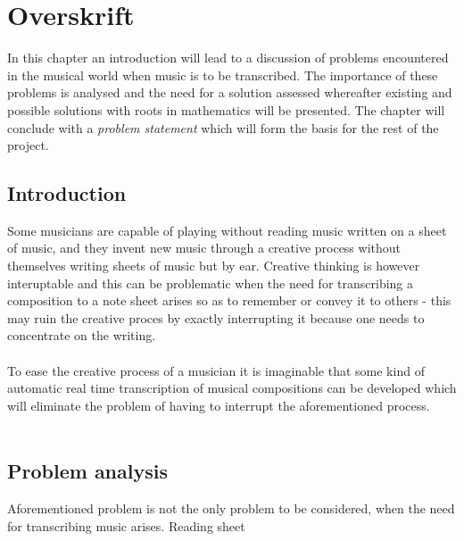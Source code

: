 \chapter{Overskrift} \label{ch1}
In this chapter an introduction will lead to a discussion of problems encountered in the musical world when music is to be transcribed. The importance of these problems is analysed and the need for a solution assessed whereafter existing and possible solutions with roots in mathematics will be presented. The chapter will conclude with a \textit{problem statement} which will form the basis for the rest of the project.
\section{Introduction}
Some musicians are capable of playing without reading music written on a sheet of music, and they invent new music through a creative process without themselves writing sheets of music but by ear. Creative thinking is however interuptable and this can be problematic when the need for transcribing a composition to a note sheet arises so as to remember or convey it to others - this may ruin the creative proces by exactly interrupting it because one needs to concentrate on the writing.\\\\
To ease the creative process of a musician it is imaginable that some kind of automatic real time transcription of musical compositions can be developed which will eliminate the problem of having to interrupt the aforementioned process.\\\\
\section{Problem analysis}
Aforementioned problem is not the only problem to be considered, when the need for transcribing music arises. Reading sheet 
%
